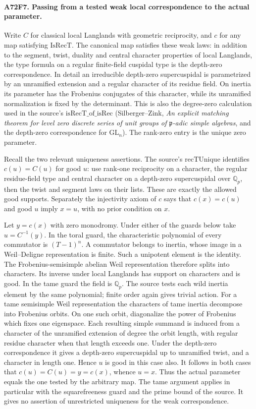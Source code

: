 \paragraph{A72F7. Passing from a tested weak local correspondence to the actual parameter.}
Write $C$ for classical local Langlands with geometric reciprocity,
and $c$ for any map satisfying $\mathrm{IsRecT}$. The canonical
map satisfies these weak laws: in addition to the segment, twist,
duality and central character properties of local Langlands,
the type formula on a regular finite-field cuspidal type is the
depth-zero correspondence. In detail an irreducible depth-zero
supercuspidal is parametrized by an unramified extension and a
regular character of its residue field. On inertia its parameter
has the Frobenius conjugates of this character, while its unramified
normalization is fixed by the determinant. This is also the
degree-zero calculation used in the source's
$\mathrm{isRecT\_of\_isRec}$
(Silberger--Zink, \emph{An explicit matching theorem for
level zero discrete series of unit groups of $\mathfrak p$-adic
simple algebras}, and the depth-zero correspondence for
$\mathrm{GL}_n$). The rank-zero entry is the unique zero parameter.

Recall the two relevant uniqueness assertions. The source's
$\mathrm{recTUnique}$ identifies $c(u)=C(u)$ for good $u$:
use rank-one reciprocity on a character, the regular residue-field
type and central character on a depth-zero supercuspidal over
$\mathbb Q_p$, then the twist and segment laws on their lists.
These are exactly the allowed good supports. Separately the
injectivity axiom of $c$ says that $c(x)=c(u)$ and good $u$
imply $x=u$, with no prior condition on $x$.

Let $y=c(x)$ with zero monodromy. Under either of the guards below
take $u=C^{-1}(y)$. In the toral guard, the characteristic
polynomial of every commutator is $(T-1)^n$. A commutator belongs
to inertia, whose image in a Weil--Deligne representation is finite.
Such a unipotent element is the identity. The Frobenius-semisimple
abelian Weil representation therefore splits into characters. Its
inverse under local Langlands has support on characters and is good.
In the tame guard the field is $\mathbb Q_p$. The source tests
each wild inertia element by the same polynomial; finite order
again gives trivial action. For a tame semisimple Weil
representation the characters of tame inertia decompose into
Frobenius orbits. On one such orbit, diagonalize the power of
Frobenius which fixes one eigenspace. Each resulting simple
summand is induced from a character of the unramified extension
of degree the orbit length, with regular residue character when
that length exceeds one. Under the depth-zero correspondence
it gives a depth-zero supercuspidal up to unramified twist, and
a character in length one. Hence $u$ is good in this case also.
It follows in both cases that $c(u)=C(u)=y=c(x)$, whence $u=x$.
Thus the actual parameter equals the one tested by the arbitrary
map. The tame argument applies in particular with the squarefreeness
guard and the prime bound of the source. It gives no assertion
of unrestricted uniqueness for the weak correspondence.

